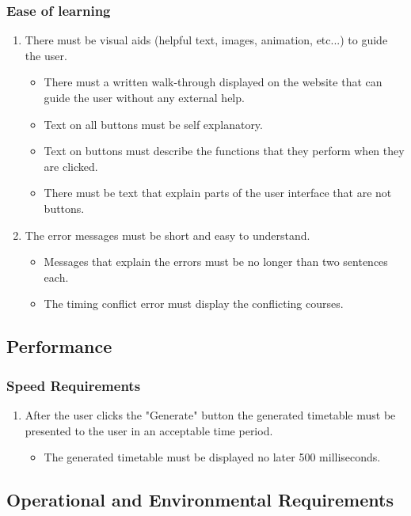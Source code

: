 \documentclass[12pt]{article}
\begin{document}
\subsubsection{Ease of learning}
\begin{enumerate}
    \item There must be visual aids (helpful text, images, animation, etc...) to guide the user.
    \begin{itemize}
        \item There must a written walk-through displayed on the website that can guide the user without any external help.
        \item Text on all buttons must be self explanatory.
        \item Text on buttons must describe the functions that they perform when they are clicked.
        \item There must be text that explain parts of the user interface that are not buttons.
    \end{itemize}
    \item The error messages must be short and easy to understand.
    \begin{itemize}
        \item Messages that explain the errors must be no longer than two sentences each.
        \item The timing conflict error must display the conflicting courses.
    \end{itemize}
\end{enumerate}

\subsection{Performance}
\subsubsection{Speed Requirements}
\begin{enumerate}
    \item After the user clicks the "Generate" button the generated timetable must be presented to the user in an acceptable time period.
    \begin{itemize}
        \item The generated timetable must be displayed no later 500 milliseconds.
    \end{itemize}
\end{enumerate}

\subsection{Operational and Environmental Requirements}
\end{document}
